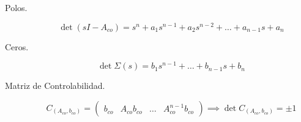         \begin{description}
            \item [Polos.]

            \begin{equation}
                \det{(sI - A_{co})} = s^n + a_1 s^{n-1} + a_2 s^{n-2} + \dots + a_{n-1} s + a_n
            \end{equation}

            \item [Ceros.]

            \begin{equation}
                \det{\Sigma(s)} = b_1 s^{n-1} + \dots + b_{n-1} s + b_n
            \end{equation}

            \item [Matriz de Controlabilidad.]

            \begin{equation}
                C_{(A_{co}, b_{co})} =
                \begin{pmatrix}
                    b_{co} & A_{co} b_{co} & \dots & A_{co}^{n-1} b_{co}
                \end{pmatrix} \implies \det{C_{(A_{co}, b_{co})}} = \pm 1
            \end{equation}
        \end{description}
